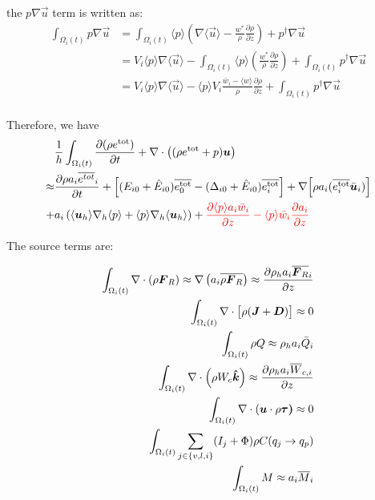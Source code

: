 \documentclass{report}
\begin{document}
the $p \nabla \vec{u}$ term is written as:
\begin{align*}
\int_{\Omega_i(t)} p \nabla\vec{u} &= 
    \int_{\Omega_i(t)} \langle p\rangle (\nabla \langle\vec{u}\rangle - \frac{w^{*}}{\rho}\frac{\partial \rho}{\partial z}) +  p^{\dagger}\nabla\vec{u}  \\
    &= V_i \langle p\rangle \nabla \langle\vec{u}\rangle   - \int_{\Omega_i(t)} \langle p\rangle  (  \frac{w^{*}}{\rho}\frac{\partial \rho}{\partial z}) + \int_{\Omega_i(t)}  p^{\dagger} \nabla \vec{u} \\
    &= V_i \langle p\rangle \nabla \langle\vec{u}\rangle - \langle p\rangle V_i  \frac{\bar{w}_i - \langle w \rangle}{\rho}\frac{\partial \rho}{\partial z} + \int_{\Omega_i(t)}  p^{\dagger} \nabla \vec{u} \\
\end{align*}




Therefore, we have 
\begin{align*}
  & \frac{1}{h}\int_{\Omega_i(t)}\frac{\partial (\rho e^\mathrm{tot})}{\partial t} + \nabla \cdot \left( (\rho e^\mathrm{tot} + p )\boldsymbol{{u}} \right)\\
 \approx& \frac{\partial \rho a_i \overline{e^{tot}}_i}{\partial t} 
 + \Big[(E_{i0} + \hat{E}_{i0}) \overline{e_0^\mathrm{tot}}  - (\Delta_{i0} + \hat{E}_{i0}) \overline{e_i^\mathrm{tot}} \Big]
 + \nabla\Big[\rho a_i(\overline{e_i^\mathrm{tot}} \bar{\boldsymbol{{u}}}_i)\Big] \\
 +&  a_i\left( \langle\boldsymbol{{u}}_h\rangle \nabla_h \langle p \rangle  +  \langle p \rangle \nabla_h \langle\boldsymbol{{u}}_h\rangle\right)
    +  {\color{red} \frac{\partial \langle p \rangle a_i \bar{w}_i}{\partial z}  -  \langle p\rangle \bar{w}_i \frac{\partial a_i}{\partial z} } \\
\end{align*}

The source terms are:

\begin{align*}
    \int_{\Omega_i(t)} \nabla \cdot (\rho \boldsymbol{{F}}_R) \approx \nabla \left(a_i \overline{\rho \boldsymbol{{F}}_R}\right) \approx \frac{\partial \rho_h a_i \overline{\boldsymbol{{F}}_R}_i}{\partial z}\\
    \int_{\Omega_i(t)} \nabla \cdot \bigl[\rho (\boldsymbol{{J}} + \boldsymbol{{D}})\bigr] \approx 0 \\
    \int_{\Omega_i(t)} \rho Q  \approx \rho_h a_i \bar{Q}_i \\
    \int_{\Omega_i(t)} \nabla \cdot \left(\rho W_c \boldsymbol{{\hat k}} \right) \approx  \frac{\partial \rho_h a_i\overline{W}_{c,i}}{\partial z}  \\
    \int_{\Omega_i(t)} \nabla \cdot (\boldsymbol{{u}} \cdot \rho\boldsymbol{{\tau)}} \approx 0 \\
    \int_{\Omega_i(t)} \sum_{j\in\{v,l,i\}}(I_j + \Phi)  \rho C(q_j \rightarrow q_p) \\
    \int_{\Omega_i(t)} M \approx a_i \overline{M}_i
\end{align*}
\end{document}
